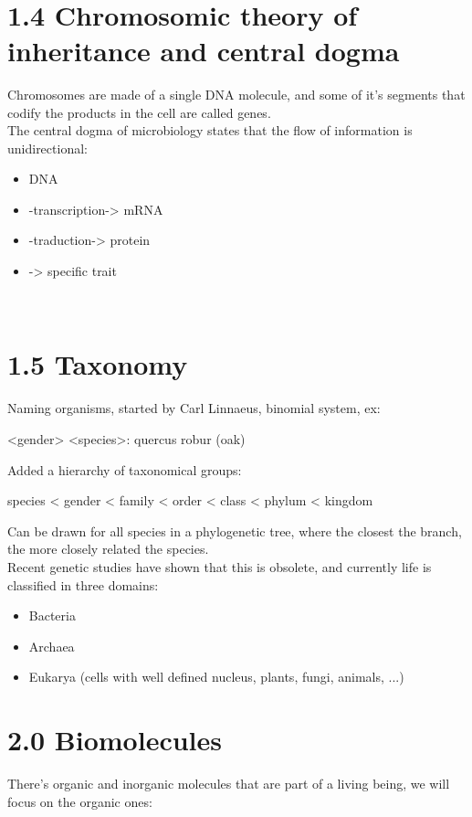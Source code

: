 \documentclass[a4paper,landscape,10pt]{cheatsheet}
\begin{document}
\hfill\\
\section{1.4 Chromosomic theory of inheritance and central dogma}
Chromosomes are made of a single DNA molecule, and some of it's segments that codify the products in the cell are called genes.\\
The central dogma of microbiology states that the flow of information is unidirectional:
\begin{itemize}
  \item DNA
  \item -transcription-> mRNA
  \item -traduction-> protein
  \item -> specific trait
\end{itemize}

\hfill\\
\section{1.5 Taxonomy}
Naming organisms, started by Carl Linnaeus, binomial system, ex:\\
\begin{center}
  <gender> <species>: quercus robur (oak)
\end{center}
Added a hierarchy of taxonomical groups:\\
\begin{center}
  species < gender < family < order < class < phylum < kingdom
\end{center}
Can be drawn for all species in a phylogenetic tree, where the closest the branch, the more closely related the species.\\
Recent genetic studies have shown that this is obsolete, and currently life is classified in three domains:
\begin{itemize}
  \item Bacteria
  \item Archaea
  \item Eukarya (cells with well defined nucleus, plants, fungi, animals, ...)
\end{itemize}

\section{2.0 Biomolecules}
There's organic and inorganic molecules that are part of a living being, we will focus on the organic ones:
\end{document}

